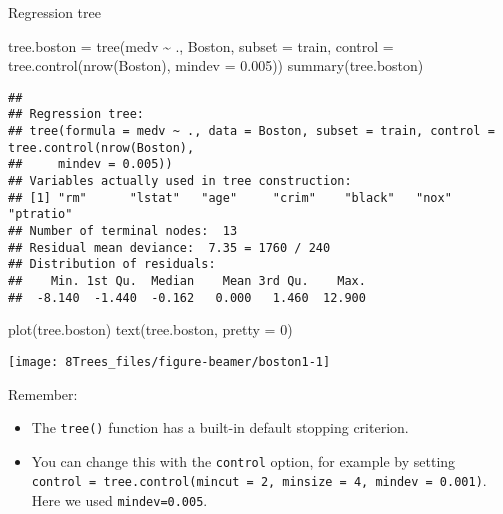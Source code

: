 \documentclass[
  10pt,
  ignorenonframetext,
]{beamer}
\newenvironment{Shaded}{\begin{snugshade}}{\end{snugshade}}
\newcommand{\AttributeTok}[1]{\textcolor[rgb]{0.77,0.63,0.00}{#1}}
\newcommand{\DecValTok}[1]{\textcolor[rgb]{0.00,0.00,0.81}{#1}}
\newcommand{\FloatTok}[1]{\textcolor[rgb]{0.00,0.00,0.81}{#1}}
\newcommand{\FunctionTok}[1]{\textcolor[rgb]{0.00,0.00,0.00}{#1}}
\newcommand{\NormalTok}[1]{#1}
\newcommand{\OtherTok}[1]{\textcolor[rgb]{0.56,0.35,0.01}{#1}}
\newcommand{\SpecialCharTok}[1]{\textcolor[rgb]{0.00,0.00,0.00}{#1}}
\providecommand{\tightlist}{%
  \setlength{\itemsep}{0pt}\setlength{\parskip}{0pt}}
\begin{document}
\begin{frame}[fragile]
\begin{block}{Regression tree}
\protect\hypertarget{regression-tree}{}
\(~\)

\scriptsize

\begin{Shaded}
\begin{Highlighting}[]
\NormalTok{tree.boston }\OtherTok{=} \FunctionTok{tree}\NormalTok{(medv }\SpecialCharTok{\textasciitilde{}}\NormalTok{ ., Boston, }\AttributeTok{subset =}\NormalTok{ train, }\AttributeTok{control =} \FunctionTok{tree.control}\NormalTok{(}\FunctionTok{nrow}\NormalTok{(Boston),}
    \AttributeTok{mindev =} \FloatTok{0.005}\NormalTok{))}
\FunctionTok{summary}\NormalTok{(tree.boston)}
\end{Highlighting}
\end{Shaded}

\begin{verbatim}
## 
## Regression tree:
## tree(formula = medv ~ ., data = Boston, subset = train, control = tree.control(nrow(Boston), 
##     mindev = 0.005))
## Variables actually used in tree construction:
## [1] "rm"      "lstat"   "age"     "crim"    "black"   "nox"     "ptratio"
## Number of terminal nodes:  13 
## Residual mean deviance:  7.35 = 1760 / 240 
## Distribution of residuals:
##    Min. 1st Qu.  Median    Mean 3rd Qu.    Max. 
##  -8.140  -1.440  -0.162   0.000   1.460  12.900
\end{verbatim}
\end{block}
\end{frame}

\begin{frame}[fragile]
\scriptsize

\begin{Shaded}
\begin{Highlighting}[]
\FunctionTok{plot}\NormalTok{(tree.boston)}
\FunctionTok{text}\NormalTok{(tree.boston, }\AttributeTok{pretty =} \DecValTok{0}\NormalTok{)}
\end{Highlighting}
\end{Shaded}

\begin{center}\texttt{[image: 8Trees\_files/figure-beamer/boston1-1]} \end{center}

\normalsize

Remember:

\begin{itemize}
\tightlist
\item
  The \texttt{tree()} function has a built-in default stopping
  criterion.
\item
  You can change this with the \texttt{control} option, for example by
  setting
  \texttt{control\ =\ tree.control(mincut\ =\ 2,\ minsize\ =\ 4,\ mindev\ =\ 0.001)}.
  Here we used \texttt{mindev=0.005}.
\end{itemize}
\end{frame}
\end{document}
